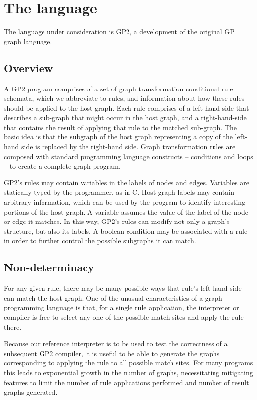 
\section{The language}


The language under consideration is GP2, a development of the original GP graph language.


\subsection{Overview}

A GP2 program comprises of a set of graph transformation conditional rule schemata, which we abbreviate to rules, and information about how these rules should be applied to the host graph. Each rule comprises of a left-hand-side that describes a sub-graph that might occur in the host graph, and a right-hand-side that contains the result of applying that rule to the matched sub-graph. The basic idea is that the subgraph of the host graph representing a copy of the left-hand side is replaced by the right-hand side. Graph transformation rules are composed with standard programming language constructs -- conditions and loops -- to create a complete graph program.


GP2’s rules may contain variables in the labels of nodes and edges. Variables are statically typed by the programmer, as in C. Host graph labels may contain arbitrary information, which can be used by the program to identify interesting portions of the host graph. A variable assumes the value of the label of the node or edge it matches. In this way, GP2’s rules can modify not only a graph’s structure, but also its labels. A boolean condition may be associated with a rule in order to further control the possible subgraphs it can match.


\subsection{Non-determinacy}


For any given rule, there may be many possible ways that rule’s left-hand-side can match the host graph. One of the unusual characteristics of a graph programming language is that, for a single rule application, the interpreter or compiler is free to select any one of the possible match sites and apply the rule there.


Because our reference interpreter is to be used to test the correctness of a subsequent GP2 compiler, it is useful to be able to generate the graphs corresponding to applying the rule to all possible match sites. For many programs this leads to exponential growth in the number of graphs, necessitating mitigating features to limit the number of rule applications performed and number of result graphs generated.

